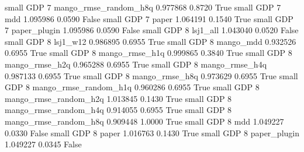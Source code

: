      small      GDP                 7 mango_rmse_random_h8q   0.977868      0.8720    True
     small      GDP                 7                   mdd   1.095986      0.0590   False
     small      GDP                 7                 paper   1.064191      0.1540    True
     small      GDP                 7          paper_plugin   1.095986      0.0590   False
     small      GDP                 8              lsj1_all   1.043040      0.0520   False
     small      GDP                 8              lsj1_w12   0.986895      0.6955    True
     small      GDP                 8             mango_mdd   0.932526      0.6955    True
     small      GDP                 8        mango_rmse_h1q   0.999865      0.3840    True
     small      GDP                 8        mango_rmse_h2q   0.965288      0.6955    True
     small      GDP                 8        mango_rmse_h4q   0.987133      0.6955    True
     small      GDP                 8        mango_rmse_h8q   0.973629      0.6955    True
     small      GDP                 8 mango_rmse_random_h1q   0.960286      0.6955    True
     small      GDP                 8 mango_rmse_random_h2q   1.013845      0.1430    True
     small      GDP                 8 mango_rmse_random_h4q   0.914055      0.6955    True
     small      GDP                 8 mango_rmse_random_h8q   0.909448      1.0000    True
     small      GDP                 8                   mdd   1.049227      0.0330   False
     small      GDP                 8                 paper   1.016763      0.1430    True
     small      GDP                 8          paper_plugin   1.049227      0.0345   False